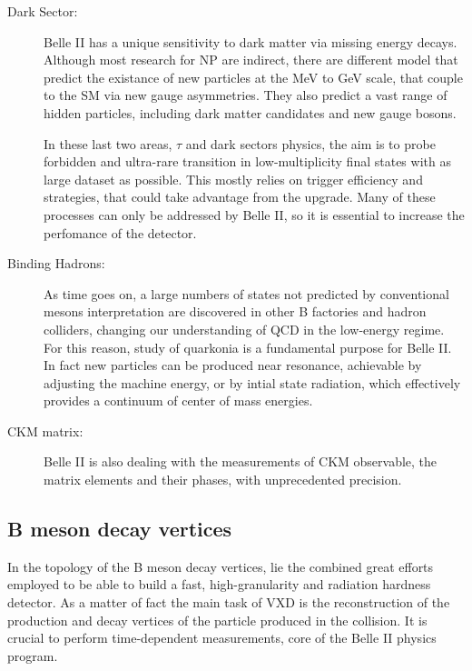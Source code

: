 \begin{description}
\item[Dark Sector:] Belle II has a unique sensitivity to dark matter via missing energy decays. Although most research for NP are indirect, there are different model that predict the existance of new particles at the MeV to GeV scale, that couple to the SM via new gauge asymmetries. They also predict a vast range of hidden particles, including dark matter candidates and new gauge bosons.

In these last two areas, $\tau$ and dark sectors physics, the aim is to probe forbidden and ultra-rare transition in low-multiplicity final states with as large dataset as possible. This mostly relies on trigger efficiency and strategies, that could take advantage from the upgrade. Many of these processes can only be addressed by Belle II, so it is essential to increase the perfomance of the detector.

\item[Binding Hadrons:] As time goes on, a large numbers of states not predicted by conventional mesons interpretation are discovered in other B factories and hadron colliders, changing our understanding of QCD in the low-energy regime. For this reason, study of quarkonia is a fundamental purpose for Belle II. In fact new particles can be produced near resonance, achievable by adjusting the machine energy, or by intial state radiation, which effectively provides a continuum of center of mass energies. 

\item[CKM matrix:] Belle II is also dealing with the measurements of CKM observable, the matrix elements and their phases, with unprecedented precision. 

\end{description}




\subsection{B meson decay vertices} \label{vertex_decay}

In the topology of the B meson decay vertices, lie the combined great efforts employed to be able to build a fast, high-granularity and radiation hardness detector. As a matter of fact the main task of VXD is the reconstruction of the production and decay vertices of the particle produced in the collision. It is crucial to perform time-dependent measurements, core of the Belle II physics program.\\

